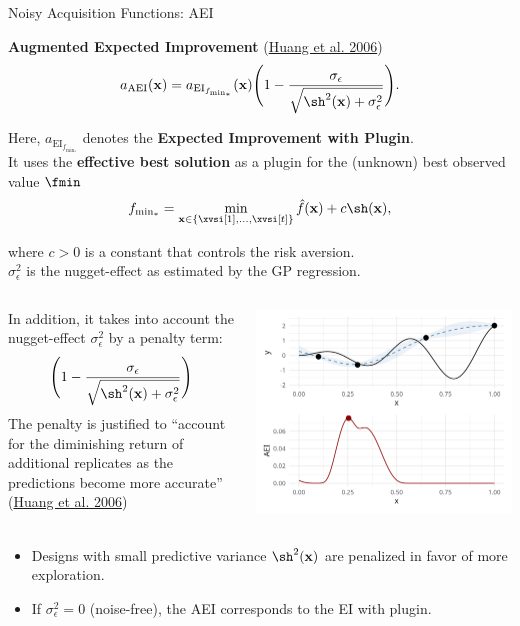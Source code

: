 \documentclass[11pt,compress,t,notes=noshow, xcolor=table]{beamer}
\begin{document}
\begin{vbframe}{Noisy Acquisition Functions: AEI}


\textbf{Augmented Expected Improvement} (\href{https://link.springer.com/article/10.1007/s10898-005-2454-3}{Huang et al. 2006})
$$
  a_{\text{AEI}}(\xv) = a_{\text{EI}_{f_{\min_*}}}(\xv) \Bigg(1- \frac{\sigma_{\epsilon}}{\sqrt{\sh^2(\xv)+ \sigma_{\epsilon}^{2}}}\Bigg).
$$

Here, $a_{\text{EI}_{f_{\min_*}}}$ denotes the \textbf{Expected Improvement with Plugin}.\\
It uses the \textbf{effective best solution} as a plugin for the (unknown) best observed value $\fmin$
$$
  f_{\min_*} = \min_{\xv \in \{\xvsi[1], ..., \xvsi[t]\}} \fh(\xv) + c \sh(\xv),
$$

where $c > 0$ is a constant that controls the risk aversion.\\
\vspace{1em}
$\sigma_{\epsilon}^{2}$ is the nugget-effect as estimated by the GP regression.


\framebreak
\begin{columns}[T]
\begin{column}{0.5\textwidth}
In addition, it takes into account the nugget-effect $\sigma_{\epsilon}^{2}$ by a penalty term:
$$
  \Bigg(1- \frac{\sigma_\epsilon}{\sqrt{\sh^2(\xv)+ \sigma_\epsilon^2}}\Bigg)
$$
The penalty is justified to \enquote{account for the diminishing return of additional replicates as the predictions become more accurate} (\href{https://link.springer.com/article/10.1007/s10898-005-2454-3}{Huang et al. 2006})
\end{column}
\begin{column}{0.5\textwidth}
  \includegraphics[width = \textwidth]{figure_man/noisy_3.png}
\end{column}
\end{columns}
\vfill
\begin{itemize}
  \item Designs with small predictive variance $\sh^2(\xv)$ are penalized in favor of more exploration.
  \item If $\sigma_\epsilon^2 = 0$ (noise-free), the AEI corresponds to the EI with plugin. 
\end{itemize}


\end{vbframe}
\end{document}
